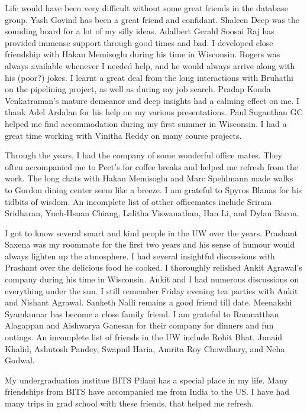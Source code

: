 Life would have been very difficult without some great friends in the database group. 
Yash Govind has been a great friend and confidant.
Shaleen Deep was the sounding board for a lot of my silly ideas.
Adalbert Gerald Soosai Raj has provided immense support through good times and bad. 
I developed close friendship with Hakan Memisoglu during his time in Wisconsin.
Rogers was always available whenever I needed help, and he would always arrive along with his (poor?) jokes. 
I learnt a great deal from the long interactions with Bruhathi on the pipelining project, as well as during my job search.
Pradap Konda Venkatraman's mature demeanor and deep insights had a calming effect on me.
I thank Adel Ardalan for his help on my various presentations. 
Paul Suganthan GC helped me find accommodation during my first summer in Wisconsin. 
I had a great time working with Vinitha Reddy on many course projects.

Through the years, I had the company of some wonderful office mates. 
They often accompanied me to Peet's for coffee breaks and helped me refresh from the work.
The long chats with Hakan Memisoglu and Marc Spehlmann made walks to Gordon dining center seem like a breeze.
I am grateful to Spyros Blanas for his tidbits of wisdom. 
An incomplete list of otther officemates include Sriram Sridharan, Yueh-Hsuan Chiang, Lalitha Viswanathan, Han Li, and Dylan Bacon.

I got to know several smart and kind people in the UW over the years. 
Prashant Saxena was my roommate for the first two years and his sense of humour would always lighten up the atmosphere. 
I had several insightful discussions with Prashant over the delicious food he cooked. 
I thoroughly relished Ankit Agrawal's company during his time in Wisconsin.
Ankit and I had numerous discussions on everything under the sun.
I still remember Friday evening tea parties with Ankit and Nishant Agrawal. 
Sanketh Nalli remains a good friend till date.
Meenakshi Syamkumar has become a close family friend. 
I am grateful to Ramnatthan Alagappan and Aishwarya Ganesan for their company for dinners and fun outings.
An incomplete list of friends in the UW include Rohit Bhat, Junaid Khalid, Ashutosh Pandey, Swapnil Haria, Amrita Roy Chowdhury, and Neha Godwal. 

My undergraduation institue BITS Pilani has a special place in my life.
Many friendships from BITS have accompanied me from India to the US. 
I have had many trips in grad school with these friends, that helped me refresh.

